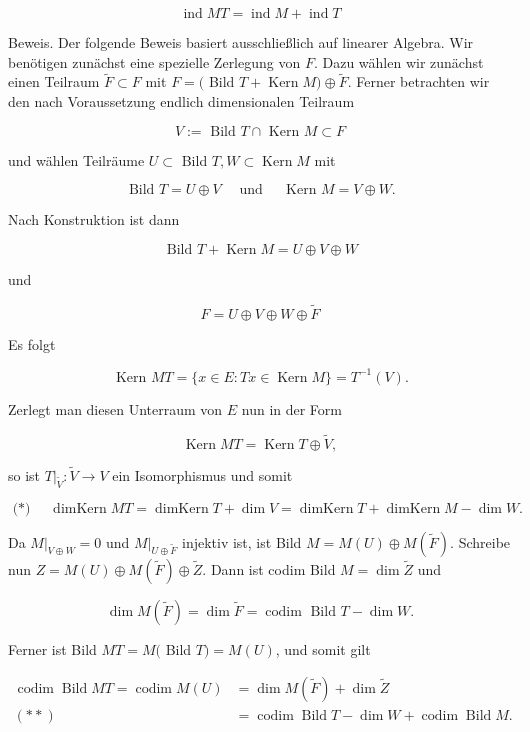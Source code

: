 \documentclass[10pt, letterpaper]{article}
\begin{document}
$$
\operatorname{ind} M T=\operatorname{ind} M+\operatorname{ind} T
$$

Beweis. Der folgende Beweis basiert ausschließlich auf linearer Algebra. Wir benötigen zunächst eine spezielle Zerlegung von $F$. Dazu wählen wir zunächst einen Teilraum $\tilde{F} \subset F$ mit $F=($ Bild $T+\operatorname{Kern} M) \oplus \tilde{F}$. Ferner betrachten wir den nach Voraussetzung endlich dimensionalen Teilraum

$$
V:=\text { Bild } T \cap \text { Kern } M \subset F
$$

und wählen Teilräume $U \subset$ Bild $T, W \subset \operatorname{Kern} M$ mit

$$
\text { Bild } T=U \oplus V \quad \text { und } \quad \text { Kern } M=V \oplus W .
$$

Nach Konstruktion ist dann

$$
\text { Bild } T+\operatorname{Kern} M=U \oplus V \oplus W
$$

und

$$
F=U \oplus V \oplus W \oplus \tilde{F}
$$

Es folgt

$$
\text { Kern } M T=\{x \in E: T x \in \operatorname{Kern} M\}=T^{-1}(V) .
$$

Zerlegt man diesen Unterraum von $E$ nun in der Form

$$
\operatorname{Kern} M T=\operatorname{Kern} T \oplus \tilde{V},
$$

so ist $\left.T\right|_{\tilde{V}}: \tilde{V} \rightarrow V$ ein Isomorphismus und somit

$$
\text { (*) } \quad \operatorname{dimKern} M T=\operatorname{dimKern} T+\operatorname{dim} V=\operatorname{dimKern} T+\operatorname{dimKern} M-\operatorname{dim} W .
$$

Da $\left.M\right|_{V \oplus W}=0$ und $\left.M\right|_{U \oplus \tilde{F}}$ injektiv ist, ist Bild $M=M(U) \oplus M(\tilde{F})$. Schreibe nun $Z=M(U) \oplus M(\tilde{F}) \oplus \tilde{Z}$. Dann ist codim Bild $M=\operatorname{dim} \tilde{Z}$ und

$$
\operatorname{dim} M(\tilde{F})=\operatorname{dim} \tilde{F}=\operatorname{codim} \text { Bild } T-\operatorname{dim} W .
$$

Ferner ist Bild $M T=M($ Bild $T)=M(U)$, und somit gilt

$$
\begin{aligned}
\operatorname{codim} \operatorname{Bild} M T=\operatorname{codim} M(U) & =\operatorname{dim} M(\tilde{F})+\operatorname{dim} \tilde{Z} \\
(* *) & =\operatorname{codim} \operatorname{Bild} T-\operatorname{dim} W+\operatorname{codim} \operatorname{Bild} M .
\end{aligned}
$$
\end{document}
